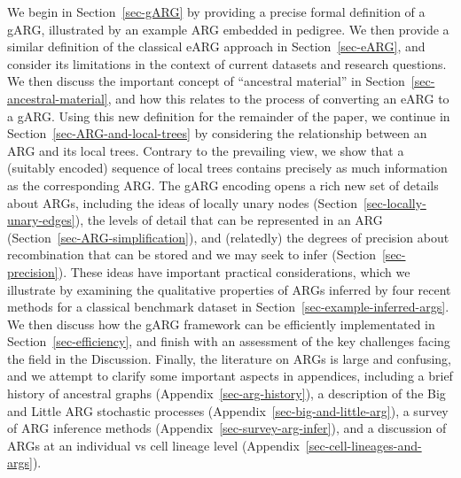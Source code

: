 \documentclass{article}
\begin{document}



We begin in Section~\ref{sec-gARG} by providing a precise formal definition
of a gARG, illustrated by an example ARG embedded in pedigree.
We then provide a similar definition of the classical eARG
approach in Section~\ref{sec-eARG}, and consider its limitations
in the context of current datasets and research questions.
We then discuss the important concept of ``ancestral material''
in Section~\ref{sec-ancestral-material}, and how this relates
to the process of converting an eARG to a gARG.
Using this new definition for the remainder of the paper,
we continue
in Section~\ref{sec-ARG-and-local-trees} by considering the relationship
between an ARG and its local trees. Contrary to the
prevailing view, we show that a (suitably encoded) sequence of local trees contains
precisely as much information as the corresponding ARG.
The gARG encoding opens a rich new set of details about ARGs,
including the ideas of locally unary nodes
(Section~\ref{sec-locally-unary-edges}),
the levels of detail that can be represented in an ARG
(Section~\ref{sec-ARG-simplification}),
and (relatedly) the degrees of precision about recombination
that can be stored and we may seek to infer (Section~\ref{sec-precision}).
These ideas have important practical considerations,
which we illustrate by examining the qualitative properties of
ARGs inferred by four recent methods for a classical benchmark
dataset in Section~\ref{sec-example-inferred-args}.
We then discuss how the gARG framework can be
efficiently implementated in Section~\ref{sec-efficiency},
and finish with an assessment of the key challenges facing
the field in the Discussion.
Finally, the literature on ARGs is large and
confusing, and we attempt to clarify some important aspects
in appendices, including
a brief history of ancestral graphs (Appendix~\ref{sec-arg-history}),
a description of the Big and Little ARG stochastic processes
 (Appendix~\ref{sec-big-and-little-arg}),
a survey of ARG inference methods (Appendix~\ref{sec-survey-arg-infer}),
and a discussion of ARGs at an individual vs cell
lineage level (Appendix~\ref{sec-cell-lineages-and-args}).
\end{document}
